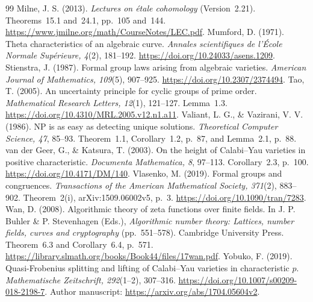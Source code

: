 \documentclass[11pt]{article}
\theoremstyle{definition}
\begin{document}
\begin{thebibliography}{99}
 Milne, J. S. (2013). \emph{Lectures on \'etale cohomology} (Version~2.21). Theorems~15.1 and~24.1, pp.~105 and~144. \url{https://www.jmilne.org/math/CourseNotes/LEC.pdf}.
 Mumford, D. (1971). Theta characteristics of an algebraic curve. \emph{Annales scientifiques de l'\'Ecole Normale Sup\'erieure, 4}(2), 181--192. \url{https://doi.org/10.24033/asens.1209}.
 Stienstra, J. (1987). Formal group laws arising from algebraic varieties. \emph{American Journal of Mathematics, 109}(5), 907--925. \url{https://doi.org/10.2307/2374494}.
 Tao, T. (2005). An uncertainty principle for cyclic groups of prime order. \emph{Mathematical Research Letters, 12}(1), 121--127. Lemma~1.3. \url{https://doi.org/10.4310/MRL.2005.v12.n1.a11}.
 Valiant, L. G., \& Vazirani, V. V. (1986). NP is as easy as detecting unique solutions. \emph{Theoretical Computer Science, 47}, 85--93. Theorem~1.1, Corollary~1.2, p.~87, and Lemma~2.1, p.~88.
 van der Geer, G., \& Katsura, T. (2003). On the height of Calabi--Yau varieties in positive characteristic. \emph{Documenta Mathematica, 8}, 97--113. Corollary~2.3, p.~100. \url{https://doi.org/10.4171/DM/140}.
 Vlasenko, M. (2019). Formal groups and congruences. \emph{Transactions of the American Mathematical Society, 371}(2), 883--902. Theorem~2(i), arXiv:1509.06002v5, p.~3. \url{https://doi.org/10.1090/tran/7283}.
 Wan, D. (2008). Algorithmic theory of zeta functions over finite fields. In J. P. Buhler \& P. Stevenhagen (Eds.), \emph{Algorithmic number theory: Lattices, number fields, curves and cryptography} (pp.~551--578). Cambridge University Press. Theorem~6.3 and Corollary~6.4, p.~571. \url{https://library.slmath.org/books/Book44/files/17wan.pdf}.
 Yobuko, F. (2019). Quasi-Frobenius splitting and lifting of Calabi--Yau varieties in characteristic $p$. \emph{Mathematische Zeitschrift, 292}(1--2), 307--316. \url{https://doi.org/10.1007/s00209-018-2198-7}. Author manuscript: \url{https://arxiv.org/abs/1704.05604v2}.
\end{thebibliography}
\end{document}
